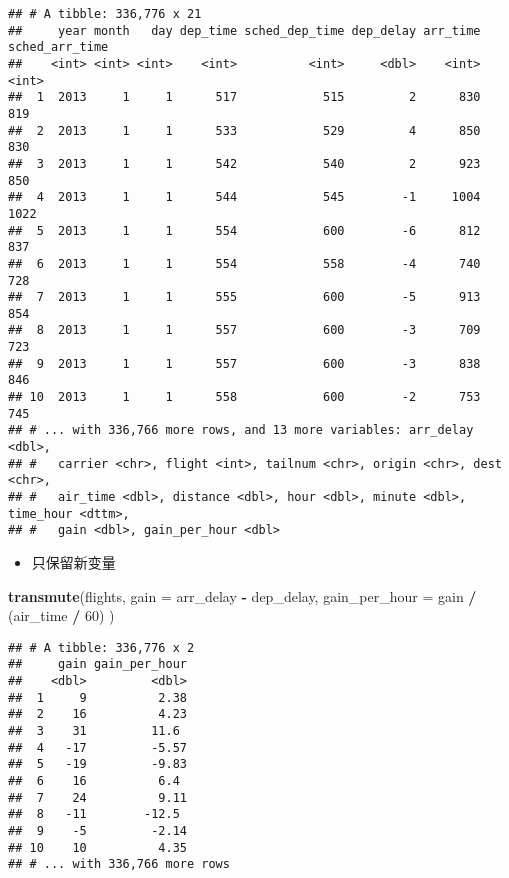 \documentclass[
]{article}
\newenvironment{Shaded}{\begin{snugshade}}{\end{snugshade}}
\newcommand{\DataTypeTok}[1]{\textcolor[rgb]{0.13,0.29,0.53}{#1}}
\newcommand{\DecValTok}[1]{\textcolor[rgb]{0.00,0.00,0.81}{#1}}
\newcommand{\KeywordTok}[1]{\textcolor[rgb]{0.13,0.29,0.53}{\textbf{#1}}}
\newcommand{\NormalTok}[1]{#1}
\newcommand{\OperatorTok}[1]{\textcolor[rgb]{0.81,0.36,0.00}{\textbf{#1}}}
\newcommand{\StringTok}[1]{\textcolor[rgb]{0.31,0.60,0.02}{#1}}
\providecommand{\tightlist}{%
  \setlength{\itemsep}{0pt}\setlength{\parskip}{0pt}}
\begin{document}
\begin{verbatim}
## # A tibble: 336,776 x 21
##     year month   day dep_time sched_dep_time dep_delay arr_time sched_arr_time
##    <int> <int> <int>    <int>          <int>     <dbl>    <int>          <int>
##  1  2013     1     1      517            515         2      830            819
##  2  2013     1     1      533            529         4      850            830
##  3  2013     1     1      542            540         2      923            850
##  4  2013     1     1      544            545        -1     1004           1022
##  5  2013     1     1      554            600        -6      812            837
##  6  2013     1     1      554            558        -4      740            728
##  7  2013     1     1      555            600        -5      913            854
##  8  2013     1     1      557            600        -3      709            723
##  9  2013     1     1      557            600        -3      838            846
## 10  2013     1     1      558            600        -2      753            745
## # ... with 336,766 more rows, and 13 more variables: arr_delay <dbl>,
## #   carrier <chr>, flight <int>, tailnum <chr>, origin <chr>, dest <chr>,
## #   air_time <dbl>, distance <dbl>, hour <dbl>, minute <dbl>, time_hour <dttm>,
## #   gain <dbl>, gain_per_hour <dbl>
\end{verbatim}

\begin{itemize}
\tightlist
\item
  只保留新变量
\end{itemize}

\begin{Shaded}
\begin{Highlighting}[]
\KeywordTok{transmute}\NormalTok{(flights,}
  \DataTypeTok{gain =}\NormalTok{ arr_delay }\OperatorTok{-}\StringTok{ }\NormalTok{dep_delay,}
  \DataTypeTok{gain_per_hour =}\NormalTok{ gain }\OperatorTok{/}\StringTok{ }\NormalTok{(air_time }\OperatorTok{/}\StringTok{ }\DecValTok{60}\NormalTok{)}
\NormalTok{)}
\end{Highlighting}
\end{Shaded}

\begin{verbatim}
## # A tibble: 336,776 x 2
##     gain gain_per_hour
##    <dbl>         <dbl>
##  1     9          2.38
##  2    16          4.23
##  3    31         11.6 
##  4   -17         -5.57
##  5   -19         -9.83
##  6    16          6.4 
##  7    24          9.11
##  8   -11        -12.5 
##  9    -5         -2.14
## 10    10          4.35
## # ... with 336,766 more rows
\end{verbatim}
\end{document}
